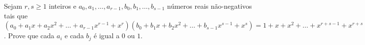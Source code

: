 Sejam \(r, s \geq 1\) inteiros e \(a_{0}, a_{1}, \ldots, a_{r-1}, b_{0}, b_{1}, \ldots, b_{s-1} \) números reais não-negativos tais que \((a_0+a_1x+a_2x^2+\ldots+a_{r-1}x^{r-1}+x^r)(b_0+b_1x+b_2x^2+\ldots+b_{s-1}x^{s-1}+x^s) =1 +x+x^2+\ldots+x^{r+s-1}+x^{r+s}\).
Prove que cada \(a_i\) e cada \(b_j\) é igual a \(0\) ou \(1\).
